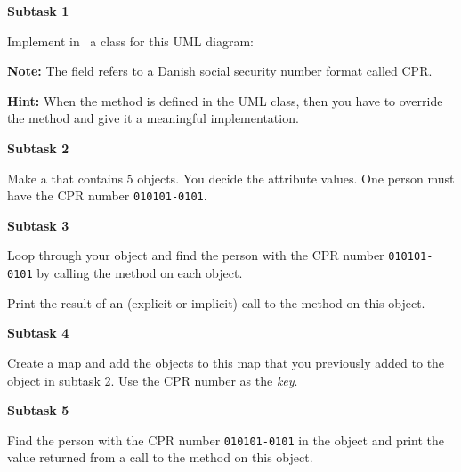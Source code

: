 \textbf{Subtask 1}

Implement in \csharp\ a class for this UML diagram:

\begin{center}
\end{center}

\textbf{Note:} The  field refers to a Danish social security number format called CPR.

\textbf{Hint:} When the  method is defined in the UML class, then you have to override the method and give it a meaningful implementation.

\textbf{Subtask 2}

Make a  that contains 5  objects. You decide the attribute values. One person must have the CPR number \texttt{010101-0101}.

\textbf{Subtask 3}

Loop through your  object and find the person with the CPR number \texttt{010101-0101} by calling the method  on each object.

Print the result of an (explicit or implicit) call to the  method on this object.

\textbf{Subtask 4}

Create a  map and add the  objects to this map that you previously added to the  object in subtask 2. Use the CPR number as the \textsl{key}.

\textbf{Subtask 5}

Find the person with the CPR number \texttt{010101-0101} in the  object and print the value returned from a call to the  method on this object.
